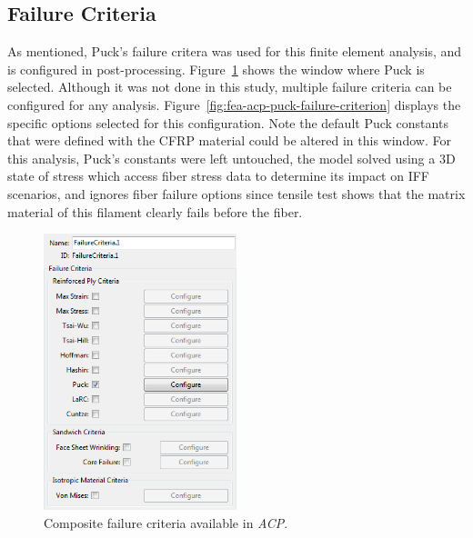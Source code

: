 \clearpage

\subsection{Failure Criteria}

\indent

As mentioned, Puck's failure critera was used for this finite element analysis, and is configured in post-processing. Figure~\ref{fig:fea-acp-failure-criteria-definition} shows the window where Puck is selected. Although it was not done in this study, multiple failure criteria can be configured for any analysis. Figure~\ref{fig:fea-acp-puck-failure-criterion} displays the specific options selected for this configuration. Note the default Puck constants that were defined with the CFRP material could be altered in this window. For this analysis, Puck's constants were left untouched, the model solved using a 3D state of stress which access fiber stress data to determine its impact on IFF scenarios, and ignores fiber failure options since tensile test shows that the matrix material of this filament clearly fails before the fiber.\\

\begin{figure}[htp]
\centering
\includegraphics[width=0.5\textwidth]{./figures/fea/fea-acp-failure-criteria-definition}
\caption{Composite failure criteria available in \textit{ACP}.}
\label{fig:fea-acp-failure-criteria-definition}
\end{figure}

